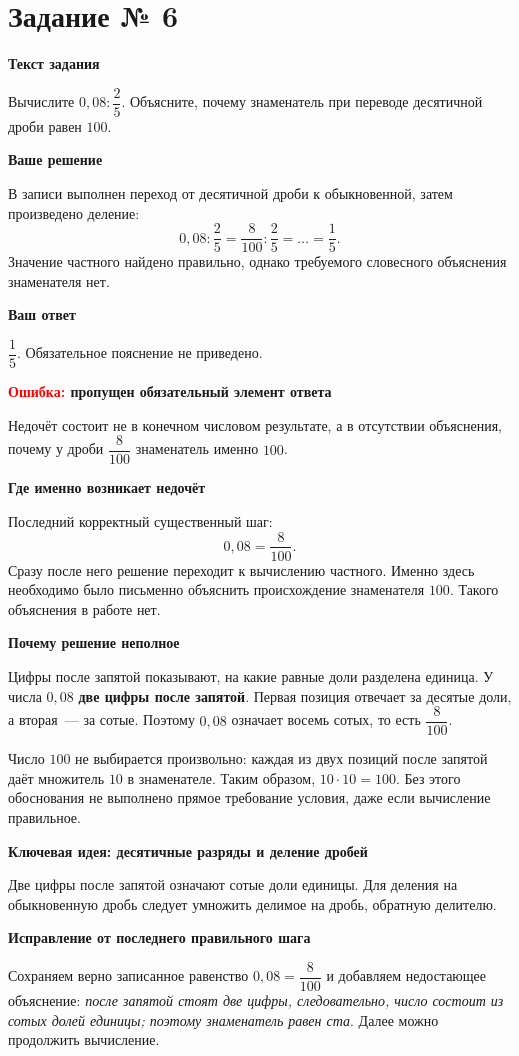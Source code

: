 \documentclass[11pt,a4paper]{article}
\newcommand{\reviewpart}[1]{\par\smallskip\textbf{#1}\par\smallskip}
\begin{document}
\label{task:6}
\section*{Задание № 6}
\reviewpart{Текст задания}
Вычислите $0{,}08:\dfrac25$. Объясните, почему знаменатель при переводе десятичной дроби равен $100$.

\reviewpart{Ваше решение}
В записи выполнен переход от десятичной дроби к обыкновенной, затем произведено деление:
\[
0{,}08:\frac25=\frac8{100}:\frac25=\ldots=\frac15.
\]
Значение частного найдено правильно, однако требуемого словесного объяснения знаменателя нет.

\reviewpart{Ваш ответ}
$\dfrac15$. Обязательное пояснение не приведено.

\reviewpart{\textcolor{red}{Ошибка:} пропущен обязательный элемент ответа}
Недочёт состоит не в конечном числовом результате, а в отсутствии объяснения, почему у дроби $\dfrac8{100}$ знаменатель именно $100$.

\reviewpart{Где именно возникает недочёт}
Последний корректный существенный шаг:
\[
0{,}08=\frac8{100}.
\]
Сразу после него решение переходит к вычислению частного. Именно здесь необходимо было письменно объяснить происхождение знаменателя $100$. Такого объяснения в работе нет.

\reviewpart{Почему решение неполное}
Цифры после запятой показывают, на какие равные доли разделена единица. У числа $0{,}08$ \textbf{две цифры после запятой}. Первая позиция отвечает за десятые доли, а вторая~--- за сотые. Поэтому $0{,}08$ означает восемь сотых, то есть $\dfrac8{100}$.

Число $100$ не выбирается произвольно: каждая из двух позиций после запятой даёт множитель $10$ в знаменателе. Таким образом, $10\cdot10=100$. Без этого обоснования не выполнено прямое требование условия, даже если вычисление правильное.

\reviewpart{\textcolor{blue!60!black}{Ключевая идея:} десятичные разряды и деление дробей}
Две цифры после запятой означают сотые доли единицы. Для деления на обыкновенную дробь следует умножить делимое на дробь, обратную делителю.

\reviewpart{Исправление от последнего правильного шага}
Сохраняем верно записанное равенство $0{,}08=\dfrac8{100}$ и добавляем недостающее объяснение: \emph{после запятой стоят две цифры, следовательно, число состоит из сотых долей единицы; поэтому знаменатель равен ста}. Далее можно продолжить вычисление.
\end{document}
